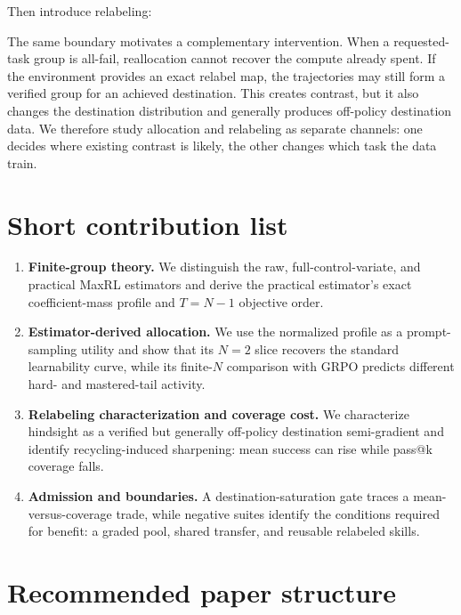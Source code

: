 \documentclass[11pt]{article}
\theoremstyle{definition}
\theoremstyle{remark}
\begin{document}
Then introduce relabeling:

\begin{rewritebox}
The same boundary motivates a complementary intervention. When a requested-task group is all-fail, reallocation cannot recover the compute already spent. If the environment provides an exact relabel map, the trajectories may still form a verified group for an achieved destination. This creates contrast, but it also changes the destination distribution and generally produces off-policy destination data. We therefore study allocation and relabeling as separate channels: one decides where existing contrast is likely, the other changes which task the data train.
\end{rewritebox}

\section{Short contribution list}

\begin{rewritebox}[title={\textbf{Four contributions---ready to paste}}]
\begin{enumerate}[leftmargin=2em]
\item \textbf{Finite-group theory.} We distinguish the raw, full-control-variate, and practical MaxRL estimators and derive the practical estimator's exact coefficient-mass profile and $T=N-1$ objective order.
\item \textbf{Estimator-derived allocation.} We use the normalized profile as a prompt-sampling utility and show that its $N=2$ slice recovers the standard learnability curve, while its finite-$N$ comparison with GRPO predicts different hard- and mastered-tail activity.
\item \textbf{Relabeling characterization and coverage cost.} We characterize hindsight as a verified but generally off-policy destination semi-gradient and identify recycling-induced sharpening: mean success can rise while pass@k coverage falls.
\item \textbf{Admission and boundaries.} A destination-saturation gate traces a mean-versus-coverage trade, while negative suites identify the conditions required for benefit: a graded pool, shared transfer, and reusable relabeled skills.
\end{enumerate}
\end{rewritebox}

\section{Recommended paper structure}
\end{document}
